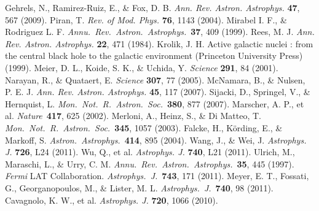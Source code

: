 \documentclass[12pt]{article}
\def\aap{{\it Astron.~Astrophys.}~}
\def\apj{{\it Astrophys.~J.}~}
\def\araa{{\it Annu.~Rev.~Astron.~Astrophys.}~}
\def\mnras{{\it Mon.~Not.~R.~Astron.~Soc.}~}
\def\nat{{\it Nature}~}
\begin{document}
\begin{thebibliography}{1}
 Gehrels, N., Ramirez-Ruiz, E., \& Fox, D. B. \emph{Ann. Rev. Astron. Astrophys.} \textbf{47}, 567 (2009).	
 Piran, T.  \emph{Rev. of Mod. Phys.} \textbf{76}, 1143 (2004).	
 Mirabel I. F., \& Rodriguez L. F. \araa 	\textbf{37}, 409 (1999).	
 Rees, M. J. \emph{Ann. Rev. Astron. Astrophys.} \textbf{22}, 471	(1984).	
 Krolik, J. H. Active galactic nuclei : from the central black hole to the galactic
environment (Princeton University Press) (1999).	
 Meier, D. L., Koide, S. K., \& Uchida, Y.  \emph{Science} \textbf{291}, 84 (2001).	
 Narayan, R., \& Quataert, E. \emph{Science} \textbf{307}, 77 (2005).	
 McNamara, B., \& Nulsen, P. E. J. \emph{Ann. Rev. Astron. Astrophys.} \textbf{45}, 117 (2007).		
 Sijacki, D., Springel, V., \& Hernquist, L. \mnras \textbf{380}, 877 (2007).		
 Marscher, A. P., et al.  \nat \textbf{417}, 625 (2002).	
 Merloni, A., Heinz, S., \& Di Matteo, T.  \mnras \textbf{345}, 1057 (2003).	
 Falcke, H., K\"ording, E., \& Markoff, S. \aap 	\textbf{414}, 895 (2004).	
 Wang, J., \& Wei, J. \emph{Astrophys. J.} \textbf{726}, L24 (2011).		
 Wu, Q., et al. \emph{Astrophys. J.} \textbf{740}, L21 (2011).		
 Ulrich, M., Maraschi, L., \& Urry, C. M. \araa \textbf{35}, 445 (1997). 
%
 \emph{Fermi} LAT Collaboration. \apj \textbf{743}, 171 (2011).		
 Meyer, E. T., Fossati, G., Georganopoulos, M., \& Lister, M. L. \apj \textbf{740}, 98 (2011).		
 Cavagnolo, K. W., et al. \emph{Astrophys. J.} \textbf{720}, 1066 (2010).	

\end{thebibliography}
\end{document}
